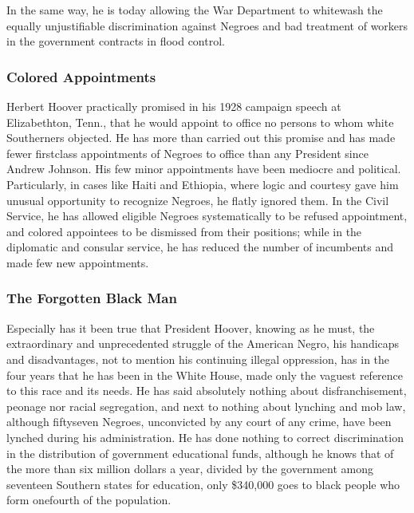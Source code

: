 \documentclass[letterpaper,10pt,english]{jupyterBook}
\begin{document}
\sphinxAtStartPar
In the same way, he is today allowing the War Department to white\sphinxhyphen{}wash the equally unjustifiable discrimination against Negroes and bad treatment of workers in the government contracts in flood control.


\subsubsection{Colored Appointments}
\label{\detokenize{Volumes/39/11/herbert_hoover:colored-appointments}}
\sphinxAtStartPar
Herbert Hoover practically promised in his 1928 campaign speech at Elizabethton, Tenn., that he would appoint to office no persons to whom white Southerners objected. He has more than carried out this promise and has made fewer first\sphinxhyphen{}class appointments of Negroes to office than any President since Andrew Johnson. His few minor appointments have been mediocre and political. Particularly, in cases like Haiti and Ethiopia, where logic and courtesy gave him unusual opportunity to recognize Negroes, he flatly ignored them. In the Civil Service, he has allowed eligible Negroes systematically to be refused appointment, and colored appointees to be dismissed from their positions; while in the diplomatic and consular service, he has reduced the number of incumbents and made few new appointments.


\subsubsection{The Forgotten Black Man}
\label{\detokenize{Volumes/39/11/herbert_hoover:the-forgotten-black-man}}
\sphinxAtStartPar
Especially has it been true that President Hoover, knowing as he must, the extraordinary and unprecedented struggle of the American Negro, his handicaps and disadvantages, not to mention his continuing illegal oppression, has in the four years that he has been in the White House, made only the vaguest reference to this race and its needs. He has said absolutely nothing about disfranchisement, peonage nor racial segregation, and next to nothing about lynching and mob law, although fifty\sphinxhyphen{}seven Negroes, unconvicted by any court of any crime, have been lynched during his administration. He has done nothing to correct discrimination in the distribution of government educational funds, although he knows that of the more than six million dollars a year, divided by the government among seventeen Southern states for education, only \$340,000 goes to black people who form one\sphinxhyphen{}fourth of the population.
\end{document}
